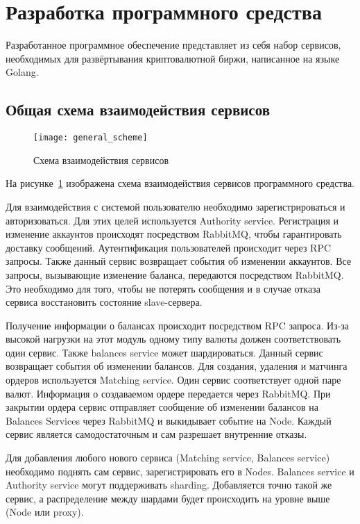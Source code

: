 \section{Разработка программного средства}\label{sec:development}

Разработанное программное обеспечение представляет из себя набор сервисов, необходимых для развёртывания криптовалютной биржи, написанное на языке Golang.

\subsection{Общая схема взаимодействия сервисов}

\begin{figure}[ht]
    \centering
    \texttt{[image: general\_scheme]}
    \caption{Схема взаимодействия сервисов}\label{fig:general_scheme}
\end{figure}

На рисунке~\ref{fig:general_scheme} изображена схема взаимодействия сервисов программного средства.

Для взаимодействия с системой пользователю необходимо зарегистрироваться и авторизоваться. Для этих целей используется Authority service. Регистрация и изменение аккаунтов происходят посредством RabbitMQ, чтобы гарантировать доставку сообщений. Аутентификация пользователей происходит через RPC запросы. Также данный сервис возвращает события об изменении аккаунтов. Все запросы, вызывающие изменение баланса, передаются посредством RabbitMQ. Это необходимо для того, чтобы не потерять сообщения и в случае отказа сервиса восстановить состояние slave-сервера.

Получение информации о балансах происходит посредством RPC запроса. Из-за высокой нагрузки на этот модуль одному типу валюты должен соответствовать один сервис. Также balances service может шардироваться. Данный сервис возвращает события об изменении балансов. Для создания, удаления и матчинга ордеров используется Matching service. Один сервис соответствует одной паре валют. Информация о создаваемом ордере передается через RabbitMQ. При закрытии ордера сервис отправляет сообщение об изменении балансов на Balances Services через RabbitMQ и выкидывает событие на Node. Каждый сервис является самодостаточным и сам разрешает внутренние отказы.

Для добавления любого нового сервиса (Matching service, Balances service) необходимо поднять сам сервис, зарегистрировать его в Nodes. Balances service и Authority service могут поддерживать sharding. Добавляется точно такой же сервис, а распределение между шардами будет происходить на уровне выше (Node или proxy).

